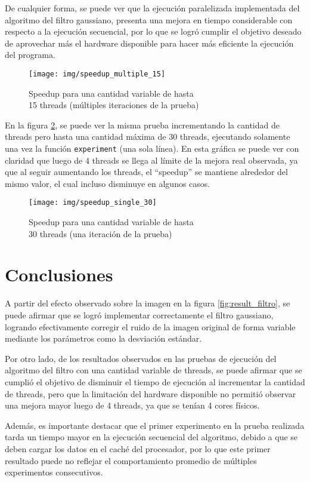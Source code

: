 \documentclass {article}
\begin{document}
De cualquier forma, se puede ver que la ejecución paralelizada implementada del algoritmo del filtro
gaussiano, presenta una mejora en tiempo considerable con respecto a la ejecución secuencial, por lo
que se logró cumplir el objetivo deseado de aprovechar más el hardware disponible para hacer más
eficiente la ejecución del programa.

\begin{figure}[H]
  \centering
  \texttt{[image: img/speedup\_multiple\_15]}
  \caption{\label{fig:speedup_multiple_15}Speedup para una cantidad variable de hasta \\15 threads (múltiples iteraciones de la prueba)}
\end{figure}

En la figura \ref{fig:speedup_single_30}, se puede ver la misma prueba incrementando la cantidad de
threads pero hasta una cantidad máxima de 30 threads, ejecutando solamente una vez la función
\texttt{experiment} (una sola línea). En esta gráfica se puede ver con claridad que luego de 4
threads se llega al límite de la mejora real observada, ya que al seguir aumentando los threads, el
``speedup'' se mantiene alrededor del mismo valor, el cual incluso disminuye en algunos casos. 

\begin{figure}[H]
  \centering
  \texttt{[image: img/speedup\_single\_30]}
  \caption{\label{fig:speedup_single_30}Speedup para una cantidad variable de hasta \\30 threads (una iteración de la prueba)}
\end{figure}

\section{Conclusiones}
A partir del efecto observado sobre la imagen en la figura \ref{fig:result_filtro}, se puede afirmar
que se logró implementar correctamente el filtro gaussiano, logrando efectivamente corregir el ruido
de la imagen original de forma variable mediante los parámetros como la desviación estándar.

Por otro lado, de los resultados observados en las pruebas de ejecución del algoritmo del filtro con
una cantidad variable de threads, se puede afirmar que se cumplió el objetivo de disminuir el tiempo
de ejecución al incrementar la cantidad de threads, pero que la limitación del hardware disponible
no permitió observar una mejora mayor luego de 4 threads, ya que se tenían 4 cores físicos.

Además, es importante destacar que el primer experimento en la prueba realizada tarda un tiempo
mayor en la ejecución secuencial del algoritmo, debido a que se deben cargar los datos en el caché
del procesador, por lo que este primer resultado puede no reflejar el comportamiento promedio de
múltiples experimentos consecutivos.




\end{document}
